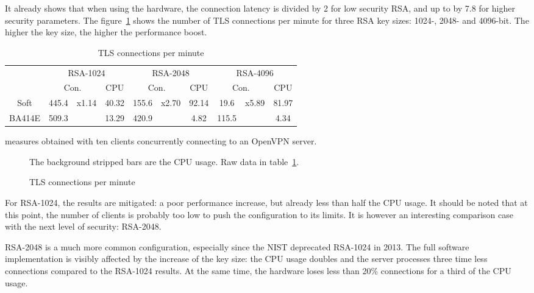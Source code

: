 It already shows that when using the hardware, the connection latency is divided by 2 for low security RSA, and up to by 7.8 for higher security parameters.
The figure~\ref{fig:openvpn-tls-bench} shows the number of TLS connections per minute for three RSA key sizes: 1024-, 2048- and 4096-bit.
The higher the key size, the higher the performance boost.


\begin{table}[ht]
\center
\small
\begin{tabular}{l|c|c|c|c|c|c|c|c|c|} \cline{2-10}
 & \multicolumn{3}{c|}{RSA-1024} & \multicolumn{3}{c|}{RSA-2048} & \multicolumn{3}{c|}{RSA-4096} \\ \cline{2-10}
 & \multicolumn{2}{c|}{Con.} & CPU & \multicolumn{2}{c|}{Con.} & CPU & \multicolumn{2}{|c|}{Con.} & CPU \\ \hline
\multicolumn{1}{|c|}{Soft} & 445.4 & \multirow{2}{*}{x1.14} & 40.32 & 155.6& \multirow{2}{*}{x2.70}  & 92.14 & 19.6& \multirow{2}{*}{x5.89}  & 81.97 \\ \cline{1-2}\cline{4-5}\cline{7-8}\cline{10-10}
\multicolumn{1}{|c|}{BA414E} & 509.3 & & 13.29 & 420.9 & & 4.82 & 115.5 & & 4.34 \\ \hline
\end{tabular}
\caption{TLS connections per minute}{measures obtained with ten clients concurrently connecting to an OpenVPN server.}
\label{tab:tls-con}
\end{table}

\begin{figure}[ht]
\center

\caption{TLS connections per minute}{The background stripped bars are the CPU usage. Raw data in table~\ref{tab:tls-con}.}
\label{fig:openvpn-tls-bench}
\end{figure}


\noindent For RSA-1024, the results are mitigated: a poor performance increase, but already less than half the CPU usage.
It should be noted that at this point, the number of clients is probably too low to push the configuration to its limits.
It is however an interesting comparison case with the next level of security: RSA-2048.

\noindent RSA-2048 is a much more common configuration, especially since the NIST deprecated RSA-1024 in 2013.
The full software implementation is visibly affected by the increase of the key size: the CPU usage doubles and the server processes three time less connections compared to the RSA-1024 results.
At the same time, the hardware loses less than 20\% connections for a third of the CPU usage.

